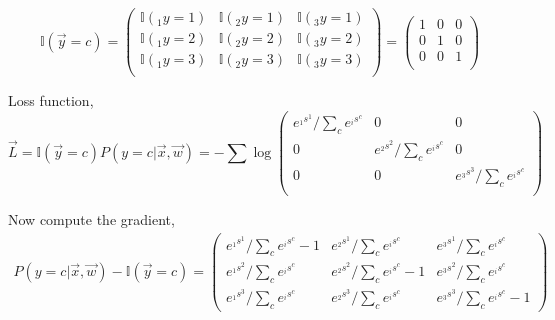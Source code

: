 \documentclass[12pt,a4paper]{article}%
\theoremstyle{definition}
\theoremstyle{plain}
\numberwithin{equation}{section}
\begin{document}
\begin{equation}
\mathbb{I}(\vec{y}=c)  =  \begin{pmatrix}
\mathbb{I}({}_1y=1) & \mathbb{I}({}_2y=1)  & \mathbb{I}({}_3y=1)  \\
\mathbb{I}({}_1y=2) & \mathbb{I}({}_2y=2)  & \mathbb{I}({}_3y=2) \\
\mathbb{I}({}_1y=3) & \mathbb{I}({}_2y=3)  & \mathbb{I}({}_3y=3)\\
\end{pmatrix} =  \begin{pmatrix}
1  &  0  & 0  \\
0 &  1   & 0   \\
0 &  0  & 1    \\
\end{pmatrix} 
\end{equation} 

Loss function,
\begin{equation}
 \vec{L} = \mathbb{I}(\vec{y}=c)  P( y = c |  \vec{x}, \vec{w})  =  - \sum \log  \begin{pmatrix}
e^{{}_1s^{1}} /\sum\limits_{c} e^{{}_is^{c}}  &  0  & 0  \\
0 &  e^{{}_2s^{2}} /\sum\limits_{c} e^{{}_is^{c}}   & 0   \\
0 &  0  & e^{{}_3s^{3}}   /\sum\limits_{c} e^{{}_is^{c}}    \\
\end{pmatrix} 
\end{equation}

Now compute the gradient, 
\begin{gather}
P( y = c |  \vec{x}, \vec{w}) - \mathbb{I}(\vec{y}=c) =  \begin{pmatrix}
e^{{}_1s^{1}} /\sum\limits_{c} e^{{}_is^{c}} -1 &  e^{{}_2s^{1}}  /\sum\limits_{c} e^{{}_is^{c}}    &  e^{{}_3s^{1}}  /\sum\limits_{c} e^{{}_is^{c}} \\
e^{{}_1s^{2}} /\sum\limits_{c} e^{{}_is^{c}} & e^{{}_2s^{2}} /\sum\limits_{c} e^{{}_is^{c}}  -1  & e^{{}_3s^{2}} /\sum\limits_{c} e^{{}_is^{c}} \\
e^{{}_1s^{3}} /\sum\limits_{c} e^{{}_is^{c}} & e^{{}_2s^{3}}   /\sum\limits_{c} e^{{}_is^{c}}   & e^{{}_3s^{3}}   /\sum\limits_{c} e^{{}_is^{c}} -1
\end{pmatrix} 
\end{gather} 
\end{document}
